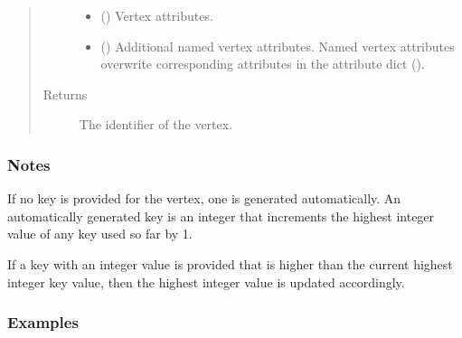 \documentclass[letterpaper,10pt,english]{sphinxmanual}
\begin{document}
\begin{fulllineitems}
\begin{fulllineitems}
\begin{quote}
\begin{description}
\begin{itemize}
\item {} 
 () \textendash{} Vertex attributes.

\item {} 
 () \textendash{} Additional named vertex attributes.
Named vertex attributes overwrite corresponding attributes in the
attribute dict ().

\end{itemize}

\item[{Returns}] \leavevmode
{} \textendash{} The identifier of the vertex.

\end{description}\end{quote}
\subsubsection*{Notes}

If no key is provided for the vertex, one is generated
automatically. An automatically generated key is an integer that increments
the highest integer value of any key used so far by 1.

If a key with an integer value is provided that is higher than the current
highest integer key value, then the highest integer value is updated accordingly.
\subsubsection*{Examples}

\begin{sphinxVerbatim}[commandchars=\\\{\}]
  
 
\end{sphinxVerbatim}


\end{fulllineitems}
\end{fulllineitems}
\end{document}
